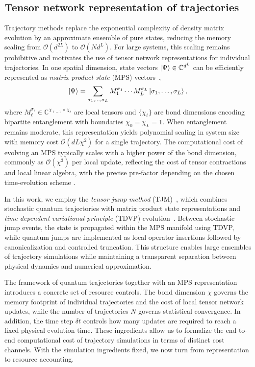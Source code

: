 \documentclass[aps, pra, superscriptaddress, reprint, floatfix]{revtex4-2}
\theoremstyle{plain}
\begin{document}
\subsection{Tensor network representation of trajectories}
Trajectory methods replace the exponential complexity of density matrix evolution by an approximate ensemble of pure states, reducing the memory scaling from $\mathcal{O}(d^{2L})$ to $\mathcal{O}(N d^L)$.
For large systems, this scaling remains prohibitive and motivates the use of tensor network representations for individual trajectories.
In one spatial dimension, state vectors $\ket{\Psi} \in \mathbb{C}^{d^L}$ can be efficiently represented as  \emph{matrix product state} (MPS) vectors~\cite{White1992, Vidal_2003, Schollwock_2011},
\begin{equation}
\ket{\Psi}
= \sum_{\sigma_1,\ldots,\sigma_L}
M^{\sigma_1}_1 \cdots M^{\sigma_L}_L
\ket{\sigma_1,\ldots,\sigma_L},
\end{equation}
where $M^{\sigma_\ell}_\ell \in \mathbb{C}^{\chi_{\ell-1} \times \chi_\ell}$ are local tensors and $\{\chi_\ell\}$ are bond dimensions encoding bipartite entanglement with boundaries $\chi_0=\chi_L=1$. When entanglement remains moderate, this representation yields polynomial scaling in system size with memory cost $\mathcal{O}(d L \chi^2)$ for a single trajectory. 
The computational cost of evolving an MPS typically scales with a higher power of the bond dimension, commonly as $\mathcal{O}(\chi^3)$ per local update, reflecting the cost of tensor contractions and local linear algebra, with the precise pre-factor depending on the chosen time-evolution scheme \cite{Schollwock_2011, Paeckel_2019}.

In this work, we employ the \emph{tensor jump method} (TJM)~\cite{sander_TJM_2025}, which combines stochastic quantum trajectories with matrix product state representations and \emph{time-dependent variational principle} (TDVP) evolution~\cite{Haegeman2011, Haegeman_2016, Paeckel_2019}. Between stochastic jump events, the state is propagated within the MPS manifold using TDVP, while quantum jumps are implemented as local operator insertions followed by canonicalization and controlled truncation. This structure enables large ensembles of trajectory simulations while maintaining a transparent separation between physical dynamics and numerical approximation.

The framework of quantum trajectories together with an MPS representation introduces a concrete set of resource controls. The bond dimension $\chi$ governs the memory footprint of individual trajectories and the cost of local tensor network updates, while the number of trajectories $N$ governs statistical convergence. In addition, the time step $\delta t$ controls how many updates are required to reach a fixed physical evolution time. These ingredients allow us to formalize the end-to-end computational cost of trajectory simulations in terms of distinct cost channels.
With the simulation ingredients fixed, we now turn from representation to resource accounting.
\end{document}

